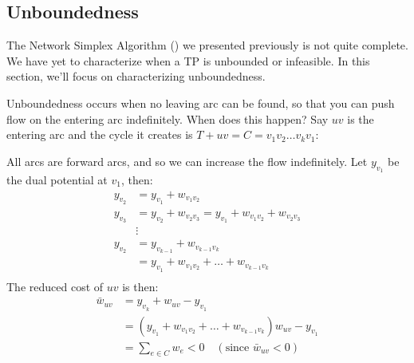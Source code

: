 \subsection{Unboundedness}
The Network Simplex Algorithm () we presented previously is not quite complete. 
We have yet to characterize when a TP is unbounded or infeasible.
In this section, we'll focus on characterizing unboundedness.

Unboundedness occurs when no leaving arc can be found, so that you can push flow on the entering arc indefinitely. When does this happen? Say $uv$ is the entering arc and the cycle it creates is $T + uv = C = v_1v_2\ldots v_kv_1$:

\begin{minipage}{\textwidth}
    \centering
\end{minipage}

All arcs are forward arcs, and so we can increase the flow indefinitely.
Let $y_{v_1}$ be the dual potential at $v_1$, then:
\begin{align*}
  y_{v_2} &= y_{v_1} + w_{v_1v_2} \\
  y_{v_3} &= y_{v_2} + w_{v_2v_3} = y_{v_1} + w_{v_1v_2} + w_{v_2v_3} \\
  &\vdots \\
  y_{v_2} &= y_{v_{k-1}} + w_{v_{k-1}v_k} \\
  &= y_{v_1} + w_{v_1v_2} + \ldots + w_{v_{k-1}v_k} \\
\end{align*}
The reduced cost of $uv$ is then:
\begin{align*}
  \bar{w}_{uv} &= y_{v_k} + w_{uv} - y_{v_1} \\
  &=  (y_{v_1} + w_{v_1v_2} + \ldots + w_{v_{k-1}v_k}) w_{uv} - y_{v_1} \\
  &= \sum_{e \in C} w_e < 0 \quad (\text{since } \bar{w}_{uv} < 0)
\end{align*}

